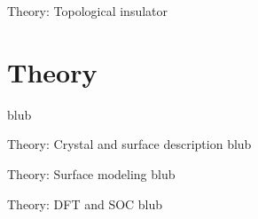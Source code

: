 \begin{frame}{Theory: Topological insulator}\section{Theory}
	blub
\end{frame}

\begin{frame}{Theory: Crystal and surface description}
	blub
\end{frame}

\begin{frame}{Theory: Surface modeling}
	blub
\end{frame}

\begin{frame}{Theory: DFT and SOC}
	blub
\end{frame}
